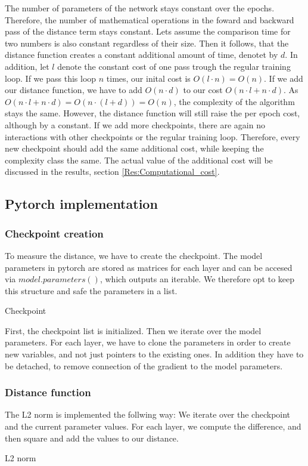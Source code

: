 The number of parameters of the network stays constant over the epochs.
Therefore, the number of mathematical operations in the foward and backward pass
of the distance term stays constant. Lets assume the comparison time for two
numbers is also constant regardless of their size. Then it follows, that the
distance function creates a constant additional amount of time, denotet by $d$.
In addition, let $l$ denote the constant cost of one pass trough the regular
training loop. If we pass this loop $n$ times, our inital cost is $O(l\cdot
n)=O(n)$. If we add our distance function, we have to add $O(n\cdot d)$ to our
cost $O(n\cdot l + n \cdot d)$. As $O(n\cdot l + n \cdot d)=O(n\cdot (l +
d))=O(n)$, the complexity of the algorithm stays the same. However, the distance
function will still raise the per epoch cost, although by a constant. If we add
more checkpoints, there are again no interactions with other checkpoints or the
regular training loop. Therefore, every new checkpoint should add the same
additional cost, while keeping the complexity class the same. The actual value
of the additional cost will be discussed in the results, section
\ref{Res:Computational_cost}.


\subsection{Pytorch implementation}

\subsubsection{Checkpoint creation}
To measure the distance, we have to create the checkpoint. The model parameters
in pytorch are stored as matrices for each layer and can be accesed via
$model.parameters()$, which outputs an iterable. We therefore opt to keep this
structure and safe the parameters in a list.
\begin{algorithm}[h!]
    \caption{Checkpoint}\label{alg:Checkpoint}
    \lstset{language=Python}
    
\end{algorithm}
\newline
First, the checkpoint list is initialized. Then we iterate over the model
parameters. For each layer, we have to clone the parameters in order to create
new variables, and not just pointers to the existing ones. In addition they have
to be detached, to remove connection of the gradient to the model parameters.

\subsubsection{Distance function}
The L2 norm is implemented the follwing way: We iterate over the checkpoint and
the current parameter values. For each layer, we compute the difference, and
then square and add the values to our distance.
\begin{algorithm}[h!]
    \caption{L2 norm}\label{alg:L2Norm}
    \lstset{language=Python}
    
\end{algorithm}

